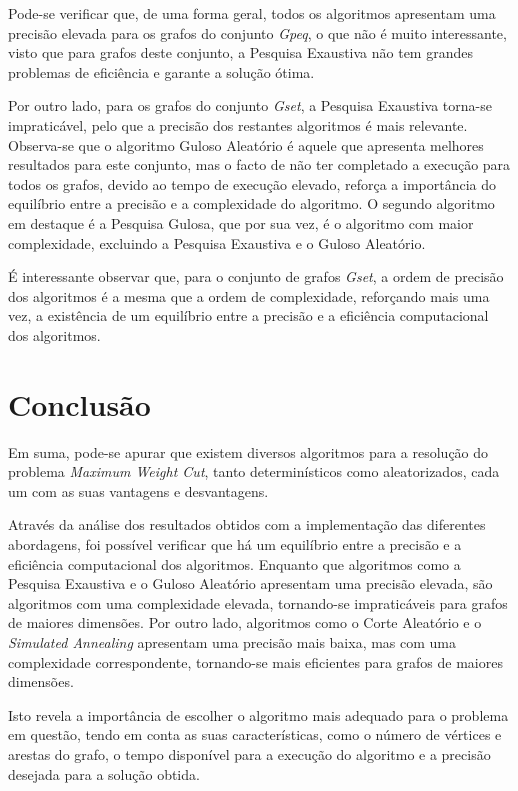 \documentclass[mirror, portugues]{revdetua}
\begin{document}
Pode-se verificar que, de uma forma geral, todos os algoritmos apresentam uma precisão elevada para os grafos do conjunto \textit{Gpeq}, o que não é muito interessante, visto que para grafos deste conjunto, a Pesquisa Exaustiva não tem grandes problemas de eficiência e garante a solução ótima.

Por outro lado, para os grafos do conjunto \textit{Gset}, a Pesquisa Exaustiva torna-se impraticável, pelo que a precisão dos restantes algoritmos é mais relevante. Observa-se que o algoritmo Guloso Aleatório é aquele que apresenta melhores resultados para este conjunto, mas o facto de não ter completado a execução para todos os grafos, devido ao tempo de execução elevado, reforça a importância do equilíbrio entre a precisão e a complexidade do algoritmo. O segundo algoritmo em destaque é a Pesquisa Gulosa, que por sua vez, é o algoritmo com maior complexidade, excluindo a Pesquisa Exaustiva e o Guloso Aleatório.

É interessante observar que, para o conjunto de grafos \textit{Gset}, a ordem de precisão dos algoritmos é a mesma que a ordem de complexidade, reforçando mais uma vez, a existência de um equilíbrio entre a precisão e a eficiência computacional dos algoritmos.

\section{Conclusão}

Em suma, pode-se apurar que existem diversos algoritmos para a resolução do problema \textit{Maximum Weight Cut}, tanto determinísticos como aleatorizados, cada um com as suas vantagens e desvantagens.

Através da análise dos resultados obtidos com a implementação das diferentes abordagens, foi possível verificar que há um equilíbrio entre a precisão e a eficiência computacional dos algoritmos. Enquanto que algoritmos como a Pesquisa Exaustiva e o Guloso Aleatório apresentam uma precisão elevada, são algoritmos com uma complexidade elevada, tornando-se impraticáveis para grafos de maiores dimensões. Por outro lado, algoritmos como o Corte Aleatório e o \textit{Simulated Annealing} apresentam uma precisão mais baixa, mas com uma complexidade correspondente, tornando-se mais eficientes para grafos de maiores dimensões.

Isto revela a importância de escolher o algoritmo mais adequado para o problema em questão, tendo em conta as suas características, como o número de vértices e arestas do grafo, o tempo disponível para a execução do algoritmo e a precisão desejada para a solução obtida.


\end{document}
